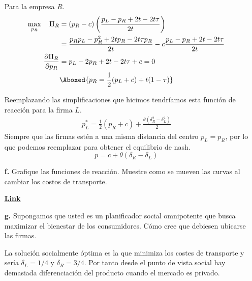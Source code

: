 \documentclass{exam}
\begin{document}
\begin{enumerate}
\begin{solution}
Para la empresa $R$.
\begin{align*}
    \max_{p_R} \quad \Pi_R &= (p_R-c) \left( \frac{p_L-p_R +2t -2t\tau}{2t}   \right) \\
    & = \frac{p_Rp_L - p_R^2 +2tp_R-2t\tau p_R}{2t} - c \frac{p_L-p_R +2t -2t\tau}{2t} \\
    \frac{\partial \Pi_R}{\partial p_R} & = p_L -2p_R+2t-2t\tau +c = 0 \\
    & \Aboxed{p_R = \frac{1}{2}(p_L + c) + t(1-\tau)}
\end{align*}

Reemplazando las simplificaciones que hicimos tendríamos esta función de reacción para la firma $L$.
\begin{align*}
    p_L^* = \frac{1}{2}(p_R+c) + \frac{\theta(\delta_R^2 -\delta_L^2)}{2}
\end{align*}
Siempre que las firmas estén a una misma distancia del centro $p_L = p_R$, por lo que podemos reemplazar para obtener el equilibrio de nash. 
\begin{equation*}
    p = c + \theta(\delta_R - \delta_L)
\end{equation*}
    \end{solution}
    \item[\textbf{f.}] Grafique las funciones de reacción. Muestre como se mueven las curvas al cambiar los costos de transporte.  
    \begin{solution}
        \textbf{ \href{https://www.geogebra.org/calculator/bv9nzjae}{\underline{Link}}}
    \end{solution}
    \item[\textbf{g.}] Supongamos que usted es un planificador social omnipotente que busca maximizar el bienestar de los consumidores. Cómo cree que debiesen ubicarse las firmas.
    \begin{solution}
        La solución socialmente óptima es la que minimiza los costes de transporte y sería $\delta_L=1/4$ y $\delta_R=3/4$. Por tanto desde el punto de vista social hay demasiada diferenciación del producto cuando el mercado es privado.
    \end{solution}
\end{enumerate}
\end{document}
